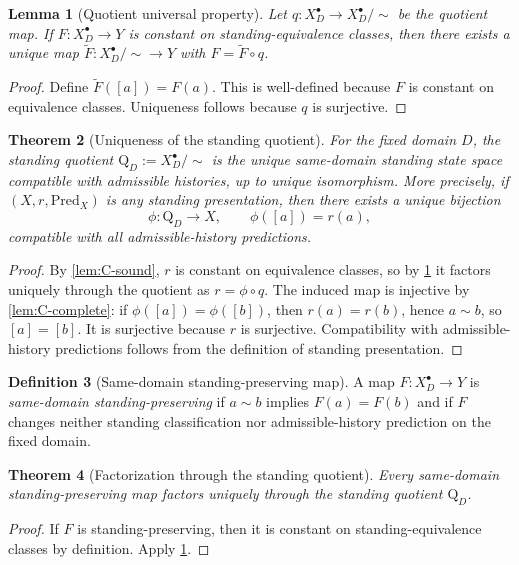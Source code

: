 \documentclass[11pt]{article}
\theoremstyle{plain}
\newtheorem{theorem}{Theorem}[section]
\newtheorem{lemma}[theorem]{Lemma}
\theoremstyle{definition}
\newtheorem{definition}[theorem]{Definition}
\newcommand{\Law}{\sim}
\newcommand{\Eval}{X_D^{\bullet}}
\newcommand{\domain}{D}
\newcommand{\Pred}{\mathrm{Pred}}
\newcommand{\Quot}{\mathrm{Q}_D}
\begin{document}
\begin{lemma}[Quotient universal property]
\label{lem:C-universal}
Let $q:\Eval\to \Eval/\Law$ be the quotient map. If $F:\Eval\to Y$ is constant on standing-equivalence classes, then there exists a unique map $\widetilde F:\Eval/\Law\to Y$ with $F=\widetilde F\circ q$.
\end{lemma}

\begin{proof}
Define $\widetilde F([a])=F(a)$. This is well-defined because $F$ is constant on equivalence classes. Uniqueness follows because $q$ is surjective.
\end{proof}

\begin{theorem}[Uniqueness of the standing quotient]
\label{thm:C-quotient-unique}
For the fixed domain $\domain$, the standing quotient $\Quot:=\Eval/\Law$ is the unique same-domain standing state space compatible with admissible histories, up to unique isomorphism. More precisely, if $(X,r,\Pred_X)$ is any standing presentation, then there exists a unique bijection
\[
\phi:\Quot\to X,
\qquad \phi([a])=r(a),
\]
compatible with all admissible-history predictions.
\end{theorem}

\begin{proof}
By \cref{lem:C-sound}, $r$ is constant on equivalence classes, so by \cref{lem:C-universal} it factors uniquely through the quotient as $r=\phi\circ q$. The induced map is injective by \cref{lem:C-complete}: if $\phi([a])=\phi([b])$, then $r(a)=r(b)$, hence $a\Law b$, so $[a]=[b]$. It is surjective because $r$ is surjective. Compatibility with admissible-history predictions follows from the definition of standing presentation.
\end{proof}

\begin{definition}[Same-domain standing-preserving map]
A map $F:\Eval\to Y$ is \emph{same-domain standing-preserving} if $a\Law b$ implies $F(a)=F(b)$ and if $F$ changes neither standing classification nor admissible-history prediction on the fixed domain.
\end{definition}

\begin{theorem}[Factorization through the standing quotient]
\label{thm:C-factor}
Every same-domain standing-preserving map factors uniquely through the standing quotient $\Quot$.
\end{theorem}

\begin{proof}
If $F$ is standing-preserving, then it is constant on standing-equivalence classes by definition. Apply \cref{lem:C-universal}.
\end{proof}
\end{document}
